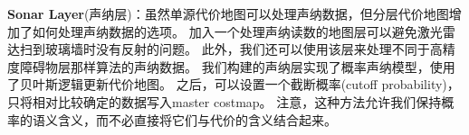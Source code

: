 \textbf{\color{blue}Sonar Layer}(声纳层)：虽然单源代价地图可以处理声纳数据，但分层代价地图增加了如何处理声纳数据的选项。 加入一个处理声纳读数的地图层可以避免激光雷达扫到玻璃墙时没有反射的问题。 
此外，我们还可以使用该层来处理不同于高精度障碍物层那样算法的声纳数据。 
我们构建的声纳层实现了概率声纳模型，使用了贝叶斯逻辑更新代价地图。 
之后，可以设置一个截断概率(cutoff probability)，
只将相对比较确定的数据写入master costmap。 
注意，这种方法允许我们保持概率的语义含义，而不必直接将它们与代价的含义结合起来。


